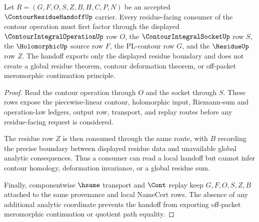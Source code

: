 \begin{theorem}
\label{thm:contour-residue-handoff-boundary}
Let $R=(G,F,O,S,Z,B,H,C,P,N)$ be an accepted $\ContourResidueHandoffUp$ carrier. Every residue-facing consumer of the contour operation must first factor through the displayed $\ContourIntegralOperationUp$ row $O$, the $\ContourIntegralSocketUp$ row $S$, the $\HolomorphicUp$ source row $F$, the PL-contour row $G$, and the $\ResidueUp$ row $Z$. The handoff exports only the displayed residue boundary and does not create a global residue theorem, contour deformation theorem, or off-packet meromorphic continuation principle.
\end{theorem}
\begin{proof}
Read the contour operation through $O$ and the socket through $S$. These rows expose the piecewise-linear contour, holomorphic input, Riemann-sum and operation-law ledgers, output row, transport, and replay routes before any residue-facing request is considered.

The residue row $Z$ is then consumed through the same route, with $B$ recording the precise boundary between displayed residue data and unavailable global analytic consequences. Thus a consumer can read a local handoff but cannot infer contour homology, deformation invariance, or a global residue sum.

Finally, componentwise $\hsame$ transport and $\Cont$ replay keep $G,F,O,S,Z,B$ attached to the same provenance and local NameCert rows. The absence of any additional analytic coordinate prevents the handoff from exporting off-packet meromorphic continuation or quotient path equality.
\end{proof}



